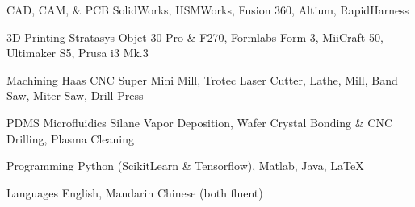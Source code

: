 


\begin{cvskills}


\cvskill
{CAD, CAM, \& PCB} %
{SolidWorks, HSMWorks, Fusion 360, Altium, RapidHarness} %


\cvskill
{3D Printing} %
{Stratasys Objet 30 Pro \& F270, Formlabs Form 3, MiiCraft 50, Ultimaker S5, Prusa i3 Mk.3} %

\cvskill
{Machining}
{Haas CNC Super Mini Mill, Trotec Laser Cutter, Lathe, Mill, Band Saw, Miter Saw, Drill Press}

\cvskill
{PDMS Microfluidics}
{Silane Vapor Deposition, Wafer Crystal Bonding \& CNC Drilling, Plasma Cleaning}

\cvskill
{Programming} %
{Python (ScikitLearn \& Tensorflow), Matlab, Java, LaTeX} %

\cvskill
{Languages}
{English, Mandarin Chinese (both fluent)}


\end{cvskills}